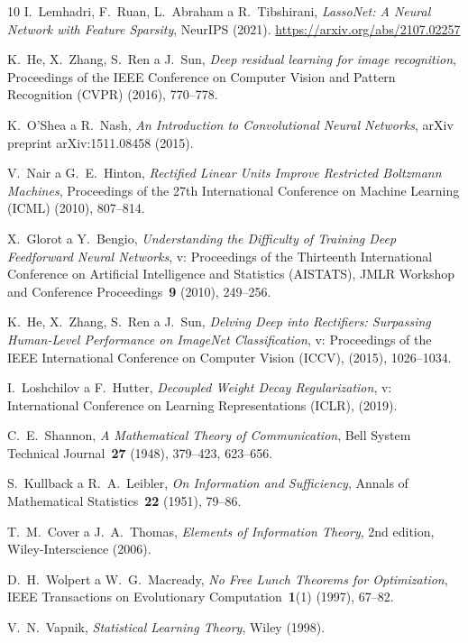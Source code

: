 \begin{thebibliography}{10}
I.~Lemhadri, F.~Ruan, L.~Abraham a R.~Tibshirani, \textit{LassoNet: A Neural Network with Feature Sparsity}, 
NeurIPS (2021). \url{https://arxiv.org/abs/2107.02257}

K.~He, X.~Zhang, S.~Ren a J.~Sun, \textit{Deep residual learning for image recognition}, 
Proceedings of the IEEE Conference on Computer Vision and Pattern Recognition (CVPR) (2016), 770--778.

K.~O'Shea a R.~Nash, \textit{An Introduction to Convolutional Neural Networks}, 
arXiv preprint arXiv:1511.08458 (2015).

V.~Nair a G.~E.~Hinton, \textit{Rectified Linear Units Improve Restricted Boltzmann Machines}, 
Proceedings of the 27th International Conference on Machine Learning (ICML) (2010), 807--814.

X.~Glorot a Y.~Bengio, \textit{Understanding the Difficulty of Training Deep Feedforward Neural Networks}, 
v: Proceedings of the Thirteenth International Conference on Artificial Intelligence and Statistics (AISTATS), 
JMLR Workshop and Conference Proceedings~\textbf{9} (2010), 249--256.

K.~He, X.~Zhang, S.~Ren a J.~Sun, \textit{Delving Deep into Rectifiers: Surpassing Human-Level Performance on ImageNet Classification}, 
v: Proceedings of the IEEE International Conference on Computer Vision (ICCV), 
(2015), 1026--1034.

I.~Loshchilov a F.~Hutter, \textit{Decoupled Weight Decay Regularization}, 
v: International Conference on Learning Representations (ICLR), 
(2019).

C.~E.~Shannon, \textit{A Mathematical Theory of Communication}, 
Bell System Technical Journal~\textbf{27} (1948), 379--423, 623--656.

S.~Kullback a R.~A.~Leibler, \textit{On Information and Sufficiency}, 
Annals of Mathematical Statistics~\textbf{22} (1951), 79--86.

T.~M.~Cover a J.~A.~Thomas, \textit{Elements of Information Theory}, 
2nd edition, Wiley-Interscience (2006).

D.~H.~Wolpert a W.~G.~Macready, \textit{No Free Lunch Theorems for Optimization}, 
IEEE Transactions on Evolutionary Computation~\textbf{1}(1) (1997), 67--82.

V.~N.~Vapnik, \textit{Statistical Learning Theory}, 
Wiley (1998).


\end{thebibliography}
